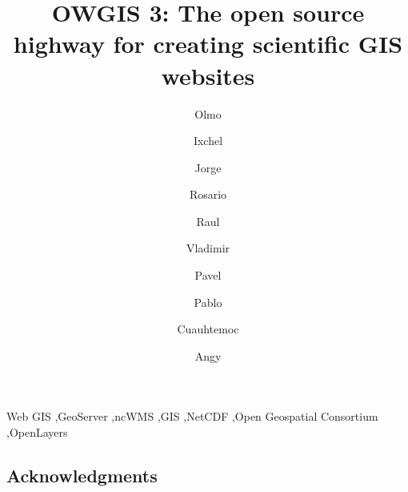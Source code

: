 \documentclass[final,authoryear,5p,times,twocolumn]{elsarticle}
\begin{document}
\begin{frontmatter}

    \title{OWGIS 3: The open source highway for creating scientific GIS websites}

    \author[miamiadd]{Olmo} 
    \author[unamadd]{ Ixchel } \ead{}
    \author[unamadd]{ Jorge } 
    \author[unamadd]{ Rosario } \ead{}
    \author[unamadd]{ Raul } \ead{}
    \author[unamadd]{ Vladimir } \ead{}
    \author[unamadd]{ Pavel } \ead{}
    \author[unamadd]{ Pablo } \ead{}
    \author[unamadd]{ Cuauhtemoc } \ead{}
    \author[unamadd]{ Angy } \ead{}

    \address[miamiadd]{Department of Scientific Computing, Florida State University,  Tallahassee FL }
    \address[unamadd]{Centro de Ciencias de la Atm\'osfera, Universidad Nacional Aut\'onoma de M\'exico, Mexico City}

    

    \begin{keyword}
    Web GIS \sep GeoServer \sep  ncWMS \sep  GIS \sep  NetCDF \sep Open Geospatial Consortium \sep  OpenLayers 
    \end{keyword}

\end{frontmatter}







\subsection*{Acknowledgments}



% 
\end{document}
